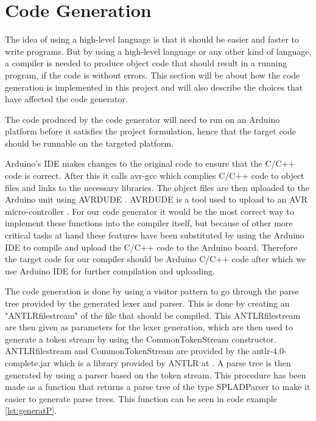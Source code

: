 \section{Code Generation}
\label{sec:codegeneration}
The idea of using a high-level language is that it should be easier and faster to write programs. But by using a high-level language or any other kind of language, a compiler is needed to produce object code that should result in a running program, if the code is without errors. This section will be about how the code generation is implemented in this project and will also describe the choices that have affected the code generator.

The code produced by the code generator will need to run on an Arduino platform before it satisfies the project formulation, hence that the target code should be runnable on the targeted platform.

Arduino's IDE makes changes to the original code to ensure that the C/C++ code is correct. After this it calls avr-gcc which complies C/C++ code to object files and links to the necessary libraries. The object files are then uploaded to the Arduino unit using AVRDUDE \citep{Buildproc}. AVRDUDE is a tool used to upload to an AVR micro-controller \citep{AVRDUDE}. For our code generator it would be the most correct way to implement these functions into the compiler itself, but because of other more critical tasks at hand these features have been substituted by using the Arduino IDE to compile and upload the C/C++ code to the Arduino board. Therefore the target code for our compiler should be Arduino C/C++ code after which we use Arduino IDE for further compilation and uploading.


The code generation is done by using a visitor pattern to go through the parse tree provided by the generated lexer and parser. This is done by creating an "ANTLRfilestream" of the file that should be compiled. This ANTLRfilestream are then given as parameters for the lexer generation, which are then used to generate a token stream by using the CommonTokenStream constructor. ANTLRfilestream and CommonTokenStream are provided by the antlr-4.0-complete.jar which is a library provided by ANTLR at \citep{DownloadANTLR}. A parse tree is then generated by using a parser based on the token stream. This procedure has been made as a function that returns a parse tree of the type SPLADParser to make it easier to generate parse trees. This function can be seen in code example \ref{lst:generatP}.


